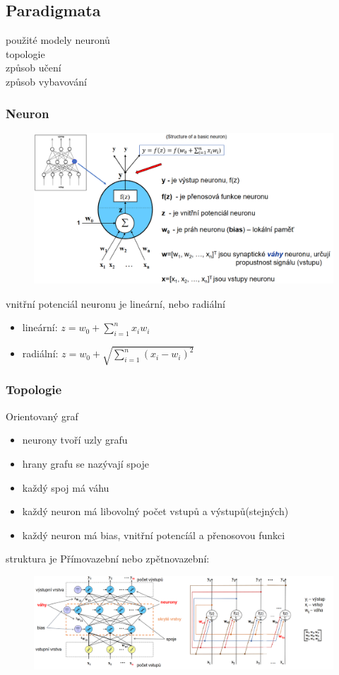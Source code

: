 \subsection{Paradigmata}
použité modely neuronů\\
topologie\\
způsob učení\\
způsob vybavování\\

\subsubsection{Neuron}
\begin{figure}[H]
    \includegraphics[scale = 0.5]{images/neuron.png}
\end{figure}
vnitřní potenciál neuronu je lineární, nebo radiální
\begin{itemize}
    \item lineární: $z = w_0 + \sum^n_{i=1}x_iw_i$
    \item radiální: $z = w_0 + \sqrt{\sum^n_{i=1}(x_i-w_i)^2}$
\end{itemize}

\subsubsection{Topologie}
Orientovaný graf
\begin{itemize}
    \item neurony tvoří uzly grafu
    \item hrany grafu se nazývají spoje
    \item každý spoj má váhu
    \item každý neuron má libovolný počet vstupů a výstupů(stejných)
    \item každý neuron má bias, vnitřní potencíál a přenosovou funkci
\end{itemize}
struktura je Přímovazební nebo zpětnovazební:
\begin{figure}[H]
    \includegraphics[scale = 0.5]{images/struktury.png}
\end{figure}


